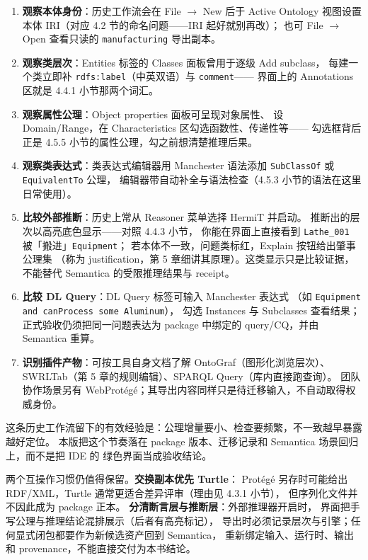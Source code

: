 \begin{enumerate}
  \item \textbf{观察本体身份}：历史工作流会在 File \(\rightarrow\) New 后于 Active Ontology
        视图设置本体 IRI（对应 4.2 节的命名问题——IRI 起好就别再改）；
        也可 File \(\rightarrow\) Open 查看只读的 \texttt{manufacturing} 导出副本。
  \item \textbf{观察类层次}：Entities 标签的 Classes 面板曾用于逐级 Add subclass，
        每建一个类立即补 \texttt{rdfs:label}（中英双语）与 \texttt{comment}——
        界面上的 Annotations 区就是 4.4.1 小节那两个词汇。
  \item \textbf{观察属性公理}：Object properties 面板可呈现对象属性、
        设 Domain/Range，在 Characteristics 区勾选函数性、传递性等——
        勾选框背后正是 4.5.5 小节的属性公理，勾之前想清楚推理后果。
  \item \textbf{观察类表达式}：类表达式编辑器用
        Manchester 语法添加 \texttt{SubClass\allowbreak Of} 或
        \texttt{Equivalent\allowbreak To} 公理，
        编辑器带自动补全与语法检查（4.5.3 小节的语法在这里日常使用）。
  \item \textbf{比较外部推断}：历史上常从 Reasoner 菜单选择 HermiT 并启动。
        推断出的层次以高亮底色显示——对照 4.4.3 小节，
        你能在界面上直接看到 \texttt{Lathe\_001} 被「搬进」\texttt{Equipment}；
        若本体不一致，问题类标红，Explain 按钮给出肇事公理集
        （称为 justification，第 5 章细讲其原理）。这类显示只是比较证据，
        不能替代 Semantica 的受限推理结果与 receipt。
  \item \textbf{比较 DL Query}：DL Query 标签可输入 Manchester 表达式
        （如 \texttt{Equipment and canProcess some Aluminum}），
        勾选 Instances 与 Subclasses 查看结果；正式验收仍须把同一问题表达为
        package 中绑定的 query/CQ，并由 Semantica 重算。
  \item \textbf{识别插件产物}：可按工具自身文档了解 OntoGraf（图形化浏览层次）、
        SWRLTab（第 5 章的规则编辑）、SPARQL Query（库内直接跑查询）。
        团队协作场景另有 WebProtégé；其导出内容同样只是待迁移输入，不自动取得权威身份。
\end{enumerate}

这条历史工作流留下的有效经验是：公理增量要小、检查要频繁，不一致越早暴露越好定位。
本版把这个节奏落在 package 版本、迁移记录和 Semantica 场景回归上，而不是把 IDE 的
绿色界面当成验收结论。

两个互操作习惯仍值得保留。\textbf{交换副本优先 Turtle}：
Protégé 另存时可能给出 RDF/XML，Turtle 通常更适合差异评审（理由见 4.3.1 小节），
但序列化文件并不因此成为 package 正本。
\textbf{分清断言层与推断层}：外部推理器开启时，
界面把手写公理与推理结论混排展示（后者有高亮标记），
导出时必须记录层次与引擎；任何显式闭包都要作为新候选资产回到 Semantica，
重新绑定输入、运行时、输出和 provenance，不能直接交付为本书结论。

